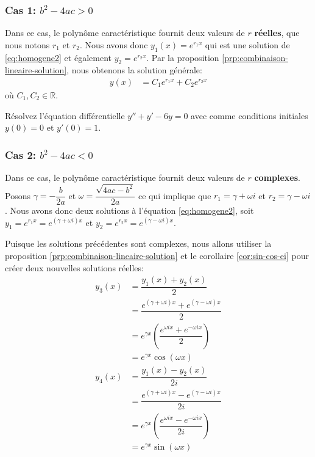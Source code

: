\documentclass[]{book}
\theoremstyle{definition}
\theoremstyle{definition}
\theoremstyle{definition}
\theoremstyle{remark}
\let\BeginKnitrBlock\begin \let\EndKnitrBlock\end
\begin{document}
\hypertarget{cas-1-b2-4ac0}{%
\subsubsection{\texorpdfstring{Cas 1:
\(b^2-4ac>0\)}{Cas 1: b\^{}2-4ac\textgreater{}0}}\label{cas-1-b2-4ac0}}

Dans ce cas, le polynôme caractéristique fournit deux valeurs de \(r\)
\textbf{réelles}, que nous notons \(r_1\) et \(r_2\). Nous avons donc
\(y_1(x)=e^{r_1x}\) qui est une solution de \eqref{eq:homogene2} et
également \(y_2=e^{r_2x}\). Par la proposition
\ref{prp:combinaison-lineaire-solution}, nous obtenons la solution
générale: \begin{align*}
y(x) &= C_1e^{r_1x}+C_2e^{r_2x}
\end{align*} où \(C_1,C_2\in\mathbb{R}\).

\BeginKnitrBlock{example}
\protect\hypertarget{exm:unnamed-chunk-77}{}{\label{exm:unnamed-chunk-77}
}Résolvez l'équation différentielle \(y''+y'-6y=0\) avec comme
conditions initiales \(y(0)=0\) et \(y'(0)=1\).
\EndKnitrBlock{example}
\vspace*{10cm}

\hypertarget{cas-2-b2-4ac0}{%
\subsubsection{\texorpdfstring{Cas 2:
\(b^2-4ac<0\)}{Cas 2: b\^{}2-4ac\textless{}0}}\label{cas-2-b2-4ac0}}

Dans ce cas, le polynôme caractéristique fournit deux valeurs de \(r\)
\textbf{complexes}. Posons \(\gamma=-\dfrac{b}{2a}\) et
\(\omega=\dfrac{\sqrt{4ac-b^2}}{2a}\) ce qui implique que
\(r_1=\gamma+\omega i\) et \(r_2=\gamma -\omega i\). Nous avons donc
deux solutions à l'équation \eqref{eq:homogene2}, soit
\(y_1=e^{r_1x}=e^{(\gamma+\omega i)x}\) et
\(y_2=e^{r_2x}=e^{(\gamma-\omega i)x}\).

Puisque les solutions précédentes sont complexes, nous allons utiliser
la proposition \ref{prp:combinaison-lineaire-solution} et le corollaire
\ref{cor:sin-cos-ei} pour créer deux nouvelles solutions réelles:
\begin{align*}
y_3(x) &= \dfrac{y_1(x)+y_2(x)}{2} \\
&= \dfrac{e^{(\gamma+\omega i)x}+e^{(\gamma-\omega i)x}}{2} \\
&= e^{\gamma x}\left( \dfrac{e^{\omega i x}+e^{-\omega i x}}{2} \right) \\
&= e^{\gamma x}\cos(\omega x) \\
y_4(x) &= \dfrac{y_1(x)-y_2(x)}{2i} \\
&= \dfrac{e^{(\gamma+\omega i)x}-e^{(\gamma-\omega i)x}}{2i} \\
&= e^{\gamma x}\left( \dfrac{e^{\omega i x}-e^{-\omega i x}}{2i} \right) \\
&= e^{\gamma x}\sin(\omega x)
\end{align*}
\end{document}
